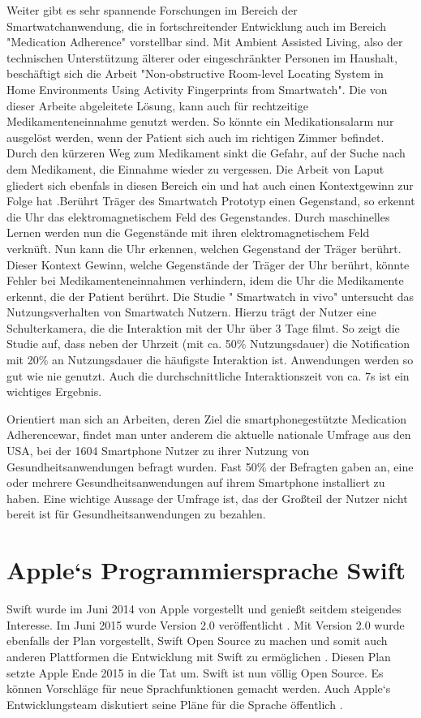 Weiter gibt es sehr spannende Forschungen im Bereich der Smartwatchanwendung, die in fortschreitender Entwicklung auch im Bereich "Medication Adherence" vorstellbar sind. Mit Ambient Assisted Living, also der technischen Unterstützung älterer oder eingeschränkter Personen im Haushalt, beschäftigt sich die Arbeit "Non-obstructive Room-level Locating System in Home Environments Using Activity Fingerprints from Smartwatch"\cite{Lee:2015:NRL:2750858.2804272}. Die von dieser Arbeite abgeleitete Lösung, kann auch für rechtzeitige Medikamenteneinnahme genutzt werden. So könnte ein Medikationsalarm nur ausgelöst werden, wenn der Patient sich auch im richtigen Zimmer befindet. Durch den kürzeren Weg zum Medikament sinkt die Gefahr, auf der Suche nach dem Medikament, die Einnahme wieder zu vergessen. Die Arbeit von Laput gliedert sich ebenfals in diesen Bereich ein und hat auch einen Kontextgewinn zur Folge hat \cite{Laput:2015:ETR:2807442.2807481}.Berührt Träger des  Smartwatch Prototyp einen Gegenstand, so erkennt die Uhr das  elektromagnetischem Feld des Gegenstandes. Durch maschinelles Lernen werden nun die Gegenstände mit ihren elektromagnetischem Feld verknüft. Nun kann die Uhr erkennen, welchen Gegenstand der Träger berührt. Dieser Kontext Gewinn, welche Gegenstände der Träger der Uhr berührt, könnte Fehler bei Medikamenteneinnahmen verhindern, idem die Uhr die Medikamente erkennt, die der Patient berührt.
Die Studie " Smartwatch in vivo" \cite{Pizza:2016} untersucht das Nutzungsverhalten von Smartwatch Nutzern. Hierzu trägt der Nutzer eine Schulterkamera, die die Interaktion mit der Uhr über 3 Tage filmt. So zeigt die Studie auf, dass neben der Uhrzeit (mit ca. 50\% Nutzungsdauer) die Notification mit 20\% an Nutzungsdauer die häufigste Interaktion ist. Anwendungen werden so gut wie nie genutzt. Auch die durchschnittliche Interaktionszeit von ca. 7s ist ein wichtiges Ergebnis.

Orientiert man sich an Arbeiten, deren Ziel die smartphonegestützte Medication Adherencewar, findet man unter anderem die aktuelle nationale Umfrage \cite{Krebs-P:2015aa} aus den USA, bei der 1604 Smartphone Nutzer zu ihrer Nutzung von Gesundheitsanwendungen befragt wurden. Fast 50\% der Befragten gaben an, eine oder mehrere Gesundheitsanwendungen auf ihrem Smartphone installiert zu haben. Eine wichtige Aussage der Umfrage ist, das der Großteil der Nutzer nicht bereit ist für Gesundheitsanwendungen zu bezahlen.

\section{Apple`s Programmiersprache Swift}
Swift wurde im Juni 2014 von Apple vorgestellt und genießt seitdem steigendes Interesse. Im Juni 2015 wurde Version 2.0 veröffentlicht \cite{Apple:2014sp}. Mit Version 2.0 wurde ebenfalls der Plan vorgestellt, Swift Open Source zu machen und somit auch anderen Plattformen die Entwicklung mit Swift zu ermöglichen \cite{Apple:2014sp}. Diesen Plan setzte Apple Ende 2015 in die Tat um. Swift ist nun völlig Open Source. Es können Vorschläge für neue Sprachfunktionen gemacht werden. Auch Apple`s Entwicklungsteam diskutiert seine Pläne für die Sprache öffentlich \cite{Apple:2015swiftOpen}.

